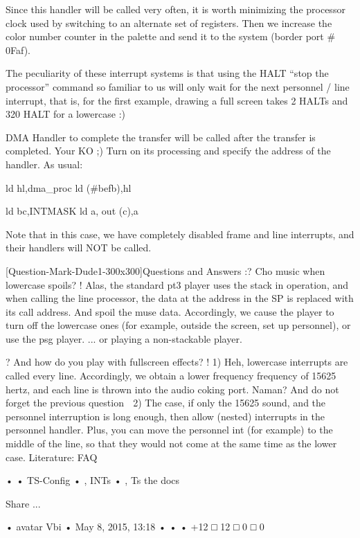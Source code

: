 Since this handler will be called very often, it is worth minimizing the
processor clock used by switching to an alternate set of registers. Then we
increase the color number counter in the palette and send it to the system
(border port # 0Faf).

The peculiarity of these interrupt systems is that using the HALT “stop the
processor” command so familiar to us will only wait for the next personnel /
line interrupt, that is, for the first example, drawing a full screen takes 2
HALTs and 320 HALT for a lowercase :)

DMA
Handler to complete the transfer will be called after the transfer is
completed. Your KO ;)
Turn on its processing and specify the address of the handler. As usual:

                ld      hl,dma_proc
                ld      (#befb),hl

                ld      bc,INTMASK
                ld      a,%
                out     (c),a


Note that in this case, we have completely disabled frame and line interrupts,
and their handlers will NOT be called.

[Question-Mark-Dude1-300x300]Questions and Answers
:? Cho music when lowercase spoils?
! Alas, the standard pt3 player uses the stack in operation, and when calling
the line processor, the data at the address in the SP is replaced with its call
address. And spoil the muse data.
Accordingly, we cause the player to turn off the lowercase ones (for example,
outside the screen, set up personnel), or use the psg player.
... or playing a non-stackable player.

? And how do you play with fullscreen effects?
! 1) Heh, lowercase interrupts are called every line. Accordingly, we obtain a
lower frequency frequency of 15625 hertz, and each line is thrown into the
audio coking port. Naman? And do not forget the previous question ^^^
2) The case, if only the 15625 sound, and the personnel interruption is long
enough, then allow (nested) interrupts in the personnel handler. Plus, you can
move the personnel int (for example) to the middle of the line, so that they
would not come at the same time as the lower case.
Literature:
FAQ

  • 
  • TS-Config
  • , INTs
  • , Ts the docs

Share ...       

  • avatar Vbi
  • May 8, 2015, 13:18
  • 
  • 
  • 
    +12
      □ 12
      □ 0
      □ 0

